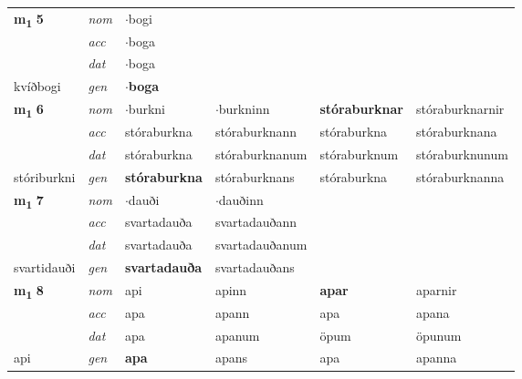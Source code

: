 \begin{longtable}[l]{llllll}
\multirow{3}{*}{{{\textbf{m{\textsubscript{1}}} \Large{\textbf{5}}}}}  & {\footnotesize{{\textit{nom}}}} & $\cdot$bogi &     & \textbf{} &   \\*
 &  {\footnotesize{{\textit{acc}}}} & $\cdot$boga  &    &   &  \\*
 &  {\footnotesize{{\textit{dat}}}} & $\cdot$boga &    &  &  \\*
 {\footnotesize{kvíðbogi}} &   {\footnotesize{{\textit{gen}}}} & \textbf{$\cdot$boga}  &   &  &  \\
\cmidrule{1-6}


\multirow{3}{*}{{{\textbf{m{\textsubscript{1}}} \Large{\textbf{6}}}}}  & {\footnotesize{{\textit{nom}}}} & $\cdot$burkni & $\cdot$burkninn    & \textbf{stóraburknar} & stóraburknarnir  \\*
 &  {\footnotesize{{\textit{acc}}}} & stóraburkna  & stóraburknann   & stóraburkna  & stóraburknana \\*
 &  {\footnotesize{{\textit{dat}}}} & stóraburkna & stóraburknanum   & stóraburknum & stóraburknunum \\*
 {\footnotesize{stóriburkni}} &   {\footnotesize{{\textit{gen}}}} & \textbf{stóraburkna}  & stóraburknans  & stóraburkna & stóraburknanna \\
\cmidrule{1-6}


\multirow{3}{*}{{{\textbf{m{\textsubscript{1}}} \Large{\textbf{7}}}}}  & {\footnotesize{{\textit{nom}}}} & $\cdot$dauði & $\cdot$dauðinn    & \textbf{} &   \\*
 &  {\footnotesize{{\textit{acc}}}} & svartadauða  & svartadauðann   &   &  \\*
 &  {\footnotesize{{\textit{dat}}}} & svartadauða & svartadauðanum   &  &  \\*
 {\footnotesize{svartidauði}} &   {\footnotesize{{\textit{gen}}}} & \textbf{svartadauða}  & svartadauðans  &  &  \\
\cmidrule{1-6}


\multirow{3}{*}{{{\textbf{m{\textsubscript{1}}} \Large{\textbf{8}}}}}  & {\footnotesize{{\textit{nom}}}} & api & apinn    & \textbf{apar} & aparnir  \\*
 &  {\footnotesize{{\textit{acc}}}} & apa  & apann   & apa  & apana \\*
 &  {\footnotesize{{\textit{dat}}}} & apa & apanum   & öpum & öpunum \\*
 {\footnotesize{api}} &   {\footnotesize{{\textit{gen}}}} & \textbf{apa}  & apans  & apa & apanna \\
\cmidrule{1-6}



\end{longtable}
